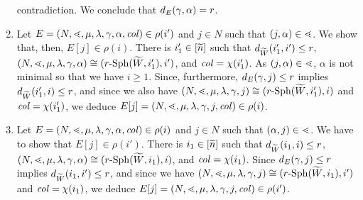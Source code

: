\documentclass{LMCS}
\begin{document}
\begin{enumerate}[(1)]
  contradiction. We conclude that $d_E(\gamma,\alpha)=r$.
\item Let $E=(N,\mathord{\lessdot},\mu,\lambda,\gamma,\alpha,\mathit{col}) \in \rho(i')$
  and $j \in N$ such that $(j,\alpha) \in \mathord{\lessdot}$. We show that, then, $E[j]
  \in \rho(i)$. There is $i_1' \in [\widetilde{n}]$ such that $d_{\widetilde{W}}(i_1',i') \le
  r$, $(N,\mathord{\lessdot},\mu,\lambda,\gamma,\alpha) \cong
  (r\text{-}\mathrm{Sph}({\widetilde{W}},i_1'),i')$, and $\mathit{col} = \chi(i_1')$. As $(j,\alpha) \in
  \mathord{\lessdot}$, $\alpha$ is not minimal so that we have $i \ge 1$. Since,
  furthermore, $d_E(\gamma,j) \le r$ implies $d_{\widetilde{W}}(i_1',i) \le
  r$, and since we also have $(N,\mathord{\lessdot},\mu,\lambda,\gamma,j) \cong
  (r\text{-}\mathrm{Sph}({\widetilde{W}},i_1'),i)$ and $\mathit{col} = \chi(i_1')$, we deduce
  $E[j]=(N,\mathord{\lessdot},\mu,\lambda,\gamma,j,\mathit{col}) \in \rho(i)$.
\item Let $E=(N,\mathord{\lessdot},\mu,\lambda,\gamma,\alpha,\mathit{col}) \in \rho(i)$
  and $j \in N$ such that $(\alpha,j) \in \mathord{\lessdot}$. We have to show that
  $E[j] \in \rho(i')$. There is $i_1 \in [\widetilde{n}]$ such that $d_{\widetilde{W}}(i_1,i) \le
  r$, $(N,\mathord{\lessdot},\mu,\lambda,\gamma,\alpha) \cong
  (r\text{-}\mathrm{Sph}({\widetilde{W}},i_1),i)$, and $\mathit{col} = \chi(i_1)$. Since $d_E(\gamma,j)
  \le r$ implies $d_{\widetilde{W}}(i_1,i') \le r$, and since we have
  $(N,\mathord{\lessdot},\mu,\lambda,\gamma,j) \cong (r\text{-}\mathrm{Sph}({\widetilde{W}},i_1),i')$ and
  $\mathit{col} = \chi(i_1)$, we deduce $E[j]=(N,\mathord{\lessdot},\mu,\lambda,\gamma,j,\mathit{col})
  \in \rho(i')$.
\end{enumerate}
\end{document}
